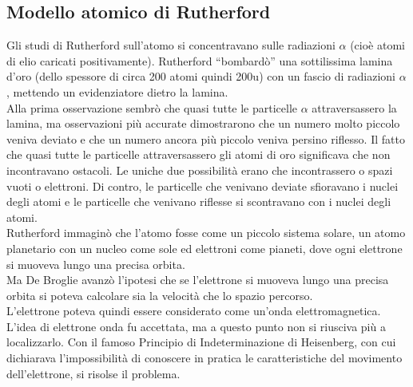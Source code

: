 \subsection{Modello atomico di Rutherford}
\label{sec:Rutherford}
\begin{defi}
  Gli studi di Rutherford sull'atomo si concentravano sulle radiazioni $\alpha$ (cioè atomi di elio caricati positivamente).
  Rutherford “bombardò” una sottilissima lamina d’oro (dello spessore di circa 200 atomi quindi 200u) con un
  fascio di radiazioni $\alpha$, mettendo un evidenziatore dietro la lamina.\\
  Alla prima osservazione sembrò che quasi tutte le particelle $\alpha$ attraversassero la lamina, ma osservazioni più
  accurate dimostrarono che un numero molto piccolo veniva deviato e che un numero ancora più piccolo veniva persino
  riflesso. Il fatto che quasi tutte le particelle attraversassero gli atomi di oro significava che non incontravano
  ostacoli. Le uniche due possibilità erano che incontrassero o spazi vuoti o elettroni. Di contro, le particelle
  che venivano deviate sfioravano i nuclei degli atomi e le particelle che venivano riflesse si scontravano con i
  nuclei degli atomi.\\
  Rutherford immaginò che l’atomo fosse come un piccolo sistema solare, un atomo planetario con un nucleo come sole
  ed elettroni come pianeti, dove ogni elettrone si muoveva lungo una precisa orbita.\\
  Ma De Broglie avanzò l’ipotesi che se l’elettrone si muoveva lungo una precisa orbita si poteva calcolare sia la
  velocità che lo spazio percorso.\\
  L’elettrone poteva quindi essere considerato come un’onda elettromagnetica. L’idea di elettrone onda fu accettata,
  ma a questo punto non si riusciva più a localizzarlo. Con il famoso Principio di Indeterminazione di Heisenberg,
  con cui dichiarava l’impossibilità di conoscere in pratica le caratteristiche del movimento dell’elettrone, si
  risolse il problema.
\end{defi}

